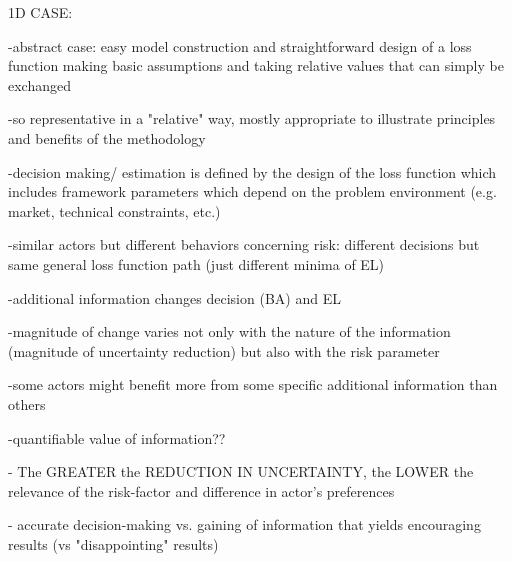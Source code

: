 	1D CASE:
	
				-abstract case: easy model construction and straightforward design of a loss function making basic assumptions and taking relative values that can simply be exchanged
			
				-so representative in a "relative" way, mostly appropriate to illustrate principles and benefits of the methodology
				
				-decision making/ estimation is defined by the design of the loss function which includes framework parameters which depend on the problem environment (e.g. market, technical constraints, etc.)
			
				-similar actors but different behaviors concerning risk: different decisions but same general loss function path (just different minima of EL)
			
				-additional information changes decision (BA) and EL
			
				-magnitude of change varies not only with the nature of the information (magnitude of uncertainty reduction) but also with the risk parameter
			
				-some actors might benefit more from some specific additional information than others
			
				-quantifiable value of information??
				
				
				
				
				- The GREATER the REDUCTION IN UNCERTAINTY, the LOWER the relevance of the risk-factor and difference in actor's preferences
				
				- accurate decision-making vs. gaining of information that yields encouraging results (vs "disappointing" results)